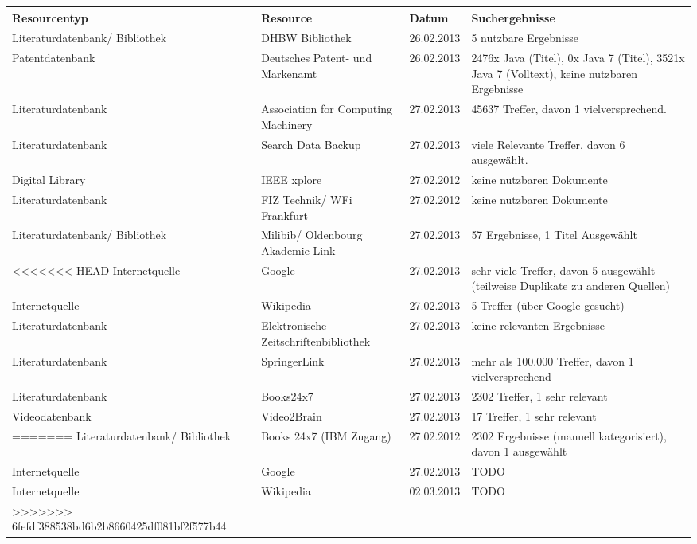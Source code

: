 \renewcommand{\arraystretch}{1.5}
\begin{longtable}{p{3.6cm}|p{3.5cm}|l|p{3.5cm}}
Resourcentyp & Resource & Datum & Suchergebnisse\\\hline\endhead
\endfoot\endlastfoot
Literaturdatenbank/ Bibliothek & DHBW Bibliothek & 26.02.2013 & 5 nutzbare Ergebnisse\\
Patentdatenbank & Deutsches Patent- und Markenamt & 26.02.2013 & 2476x Java (Titel), 0x Java 7 (Titel), 3521x Java 7 (Volltext), keine nutzbaren Ergebnisse\\
Literaturdatenbank & Association for Computing Machinery & 27.02.2013 & 45637 Treffer, davon 1 vielversprechend.\\
Literaturdatenbank & Search Data Backup & 27.02.2013 & viele Relevante Treffer, davon 6 ausgewählt.\\
Digital Library & IEEE xplore & 27.02.2012 & keine nutzbaren Dokumente\\
Literaturdatenbank & FIZ Technik/ WFi Frankfurt & 27.02.2012 & keine nutzbaren Dokumente\\
Literaturdatenbank/ Bibliothek & Milibib/ Oldenbourg Akademie Link & 27.02.2013 & 57 Ergebnisse, 1 Titel Ausgewählt\\
<<<<<<< HEAD
Internetquelle & Google & 27.02.2013 & sehr viele Treffer, davon 5 ausgewählt (teilweise Duplikate zu anderen Quellen)\\
Internetquelle & Wikipedia & 27.02.2013 & 5 Treffer (über Google gesucht)\\
Literaturdatenbank & Elektronische Zeitschriftenbibliothek & 27.02.2013 & keine relevanten Ergebnisse\\
Literaturdatenbank & SpringerLink & 27.02.2013 & mehr als 100.000 Treffer, davon 1 vielversprechend\\
Literaturdatenbank & Books24x7 & 27.02.2013 & 2302 Treffer, 1 sehr relevant\\
Videodatenbank & Video2Brain & 27.02.2013 & 17 Treffer, 1 sehr relevant\\
=======
Literaturdatenbank/ Bibliothek & Books 24x7 (IBM Zugang) & 27.02.2012 & 2302 Ergebnisse (manuell kategorisiert), davon 1 ausgewählt\\
Internetquelle & Google & 27.02.2013 & TODO\\
Internetquelle & Wikipedia & 02.03.2013 & TODO\\
>>>>>>> 6fefdf388538bd6b2b8660425df081bf2f577b44
\end{longtable}
\renewcommand{\arraystretch}{1}

